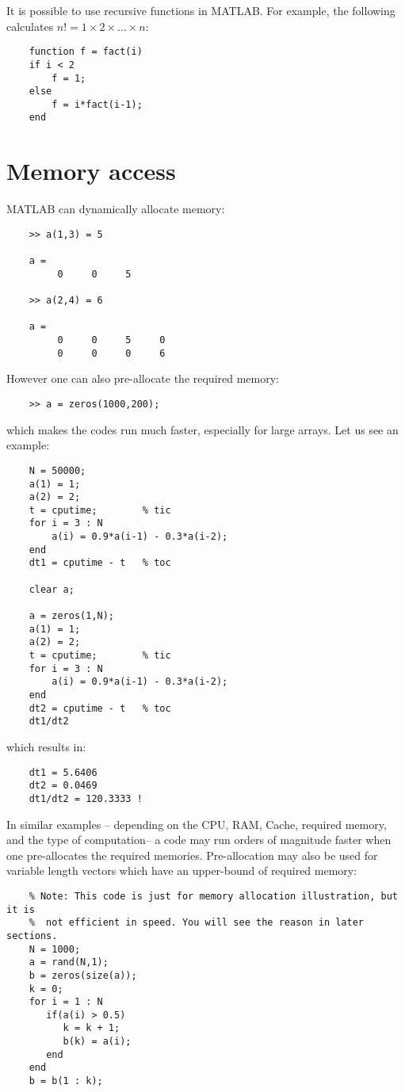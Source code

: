 \documentclass[10pt,a4paper]{article}
\newcounter{example}[section]
\begin{document}
It is possible to use recursive functions in MATLAB. For example, the following calculates $n!=1\times 2 \times \ldots \times n$:
\begin{lstlisting}
	function f = fact(i)
	if i < 2
	    f = 1;
	else
	    f = i*fact(i-1);
	end
\end{lstlisting}

\section{Memory access}
\label{sec:memory}
MATLAB can dynamically allocate memory:
\begin{lstlisting}
	>> a(1,3) = 5
	
	a =
	     0     0     5
	     
	>> a(2,4) = 6
	
	a =
	     0     0     5     0
	     0     0     0     6
\end{lstlisting}
However one can also pre-allocate the required memory:
\begin{lstlisting}
	>> a = zeros(1000,200);
\end{lstlisting}
which makes the codes run much faster, especially for large arrays. Let us see an example:
\begin{lstlisting}
	N = 50000;
	a(1) = 1;
	a(2) = 2;
	t = cputime;        % tic
	for i = 3 : N
	    a(i) = 0.9*a(i-1) - 0.3*a(i-2);
	end
	dt1 = cputime - t   % toc
	
	clear a;
	
	a = zeros(1,N);
	a(1) = 1;
	a(2) = 2;
	t = cputime;        % tic
	for i = 3 : N
	    a(i) = 0.9*a(i-1) - 0.3*a(i-2);
	end
	dt2 = cputime - t   % toc
	dt1/dt2
\end{lstlisting}
which results in:
\begin{lstlisting}
	dt1 = 5.6406
	dt2 = 0.0469
	dt1/dt2 = 120.3333 !
\end{lstlisting}
In similar examples -- depending on the CPU, RAM, Cache, required memory, and the type of computation-- a code may run orders of magnitude faster when one pre-allocates the required memories. Pre-allocation may also be used for variable length vectors which have an upper-bound of required memory:
\begin{lstlisting}
	% Note: This code is just for memory allocation illustration, but it is
	%  not efficient in speed. You will see the reason in later sections.
	N = 1000;
	a = rand(N,1);
	b = zeros(size(a));
	k = 0;
	for i = 1 : N
	   if(a(i) > 0.5)
	      k = k + 1;
	      b(k) = a(i);
	   end
	end
	b = b(1 : k);
\end{lstlisting}
\end{document}
